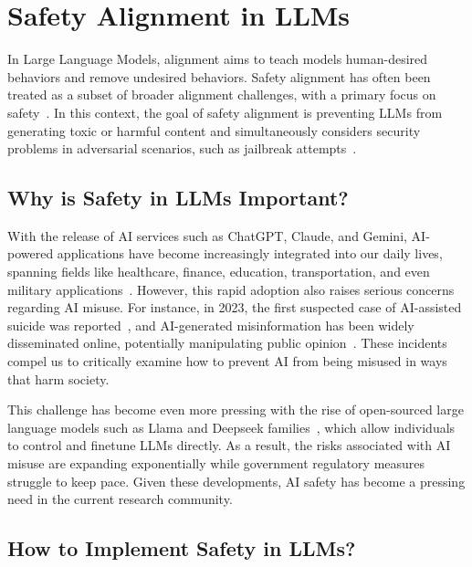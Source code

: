\section{Safety Alignment in LLMs}\label{sec:safety}

In Large Language Models, alignment aims to teach models human-desired behaviors and remove undesired behaviors. Safety alignment has often been treated as a subset of broader alignment challenges, with a primary focus on safety~\cite{li2024superficial}. In this context, the goal of safety alignment is preventing LLMs from generating toxic or harmful content and simultaneously considers security problems in adversarial scenarios, such as jailbreak attempts~\cite{qi2024ai}. 

\subsection{Why is Safety in LLMs Important?}

With the release of AI services such as ChatGPT, Claude, and Gemini, AI-powered applications have become increasingly integrated into our daily lives, spanning fields like healthcare, finance, education, transportation, and even military applications~\cite{openai2024chatgpt,team2023gemini}. However, this rapid adoption also raises serious concerns regarding AI misuse. For instance, in 2023, the first suspected case of AI-assisted suicide was reported~\cite{brusselstimes2023ai}, and AI-generated misinformation has been widely disseminated online, potentially manipulating public opinion~\cite{monteith2024artificial}. These incidents compel us to critically examine how to prevent AI from being misused in ways that harm society. 

This challenge has become even more pressing with the rise of open-sourced large language models such as Llama and Deepseek families~\cite{touvron2023llama,dubey2024llama,guo2025deepseek}, which allow individuals to control and finetune LLMs directly. As a result, the risks associated with AI misuse are expanding exponentially while government regulatory measures struggle to keep pace. Given these developments, AI safety has become a pressing need in the current research community.

\subsection{How to Implement Safety in LLMs?} %

